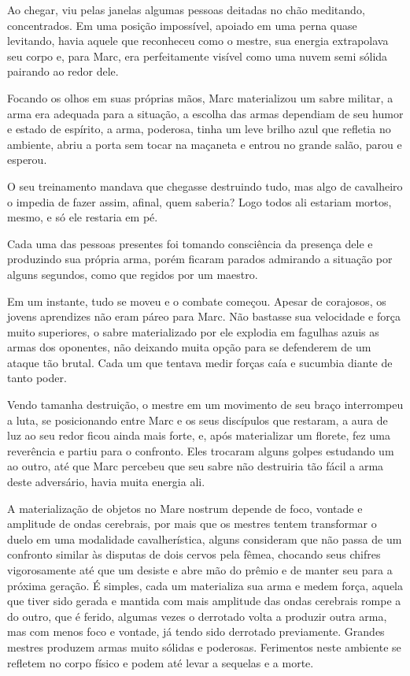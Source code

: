 Ao chegar, viu pelas janelas algumas pessoas deitadas no chão meditando,
concentrados. Em uma posição impossível, apoiado em uma perna quase
levitando, havia aquele que reconheceu como o mestre, sua energia
extrapolava seu corpo e, para Marc, era perfeitamente visível como uma
nuvem semi sólida pairando ao redor dele.

Focando os olhos em suas próprias mãos, Marc materializou um sabre
militar, a arma era adequada para a situação, a escolha das armas
dependiam de seu humor e estado de espírito, a arma, poderosa, tinha um
leve brilho azul que refletia no ambiente, abriu a porta sem tocar na
maçaneta e entrou no grande salão, parou e esperou.

O seu treinamento mandava que chegasse destruindo tudo, mas algo de
cavalheiro o impedia de fazer assim, afinal, quem saberia? Logo todos
ali estariam mortos, mesmo, e só ele restaria em pé.

Cada uma das pessoas presentes foi tomando consciência da presença dele
e produzindo sua própria arma, porém ficaram parados admirando a
situação por alguns segundos, como que regidos por um maestro.

Em um instante, tudo se moveu e o combate começou. Apesar de corajosos,
os jovens aprendizes não eram páreo para Marc. Não bastasse sua
velocidade e força muito superiores, o sabre materializado por ele
explodia em fagulhas azuis as armas dos oponentes, não deixando muita
opção para se defenderem de um ataque tão brutal. Cada um que tentava
medir forças caía e sucumbia diante de tanto poder.

Vendo tamanha destruição, o mestre em um movimento de seu braço
interrompeu a luta, se posicionando entre Marc e os seus discípulos que
restaram, a aura de luz ao seu redor ficou ainda mais forte, e, após
materializar um florete, fez uma reverência e partiu para o confronto.
Eles trocaram alguns golpes estudando um ao outro, até que Marc percebeu
que seu sabre não destruiria tão fácil a arma deste adversário, havia
muita energia ali.

A materialização de objetos no Mare nostrum depende de foco, vontade e
amplitude de ondas cerebrais, por mais que os mestres tentem transformar
o duelo em uma modalidade cavalherística, alguns consideram que não
passa de um confronto similar às disputas de dois cervos pela fêmea,
chocando seus chifres vigorosamente até que um desiste e abre mão do
prêmio e de manter seu  para a próxima geração. É simples, cada um
materializa sua arma e medem força, aquela que tiver sido gerada e
mantida com mais amplitude das ondas cerebrais rompe a do outro, que é
ferido, algumas vezes o derrotado volta a produzir outra arma, mas com
menos foco e vontade, já tendo sido derrotado previamente. Grandes
mestres produzem armas muito sólidas e poderosas. Ferimentos neste
ambiente se refletem no corpo físico e podem até levar a sequelas e a
morte.

